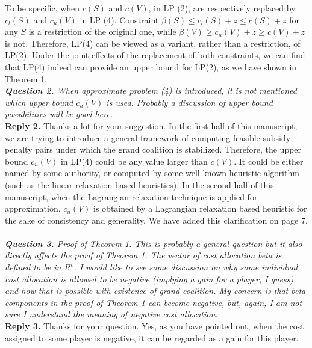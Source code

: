 \documentclass[11pt]{article}
\begin{document}
To be specific, when $c(S)$ and $c(V)$, in LP (2), are respectively replaced by $c_l(S)$ and $c_u(V)$ in LP (4).
Constraint $\beta(S) \leq c_l(S) + z \leq c(S) + z$ for any $S$ is a restriction of the original one, while $\beta(V) \geq c_u(V) + z \geq c(V) + z$ is not.
Therefore, LP(4) can be viewed as a variant, rather than a restriction, of LP(2).
Under the joint effects of the replacement of both constraints, we can find that LP(4) indeed can provide an upper bound for LP(2), as we have shown in Theorem 1.
\\[4mm]
%
%
%
\noindent \textit{\textbf{Question 2.}
When approximate problem (4) is introduced, it is not mentioned which upper bound $c_u(V)$ is used. Probably a discussion of upper bound possibilities will be good here.}
\\[2mm]
\noindent \textbf{Reply 2.}
Thanks a lot for your suggestion.
In the first half of this manuscript, we are trying to introduce a general framework of computing feasible subsidy-penalty pairs under which the grand coalition is stabilized.
Therefore, the upper bound $c_u(V)$ in LP(4) could be any value larger than $c(V)$.
It could be either named by some authority, or computed by some well known heuristic algorithm (such as the linear relaxation based heuristics).
In the second half of this manuscript, when the Lagrangian relaxation technique is applied for approximation, $c_u(V)$ is obtained by a Lagrangian relaxation based heuristic for the sake of consistency and generality.
We have added this clarification on page 7.
~\\[4mm]
%
%
%
\noindent \textit{\textbf{Question 3.}
Proof of Theorem 1. This is probably a general question but it also directly affects the proof of Theorem 1. The vector of cost allocation beta is defined to be in $R^v$.
I would like to see some discussion on why some individual cost allocation is allowed to be negative (implying a gain for a player, I guess) and how that is possible with existence of grand coalition. My concern is that beta components in the proof of Theorem 1 can become negative, but, again, I am not sure I understand the meaning of negative cost allocation.}
\\[2mm]
\noindent \textbf{Reply 3.}
Thanks for your question.
Yes, as you have pointed out, when the cost assigned to some player is negative, it can be regarded as a gain for this player.
\end{document}
